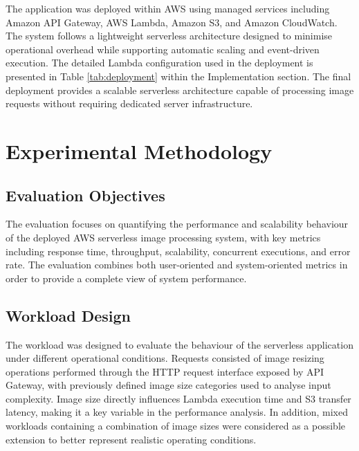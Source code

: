 \documentclass[11pt,a4paper,twocolumn]{article}
\begin{document}
The application was deployed within AWS using managed services including Amazon API Gateway, AWS Lambda, Amazon S3, and Amazon CloudWatch. The system follows a lightweight serverless architecture designed to minimise operational overhead while supporting automatic scaling and event-driven execution. The detailed Lambda configuration used in the deployment is presented in Table \ref{tab:deployment} within the Implementation section.
The final deployment provides a scalable serverless architecture capable of processing image requests without requiring dedicated server infrastructure.


\section{Experimental Methodology}

\subsection{Evaluation Objectives}

The evaluation focuses on quantifying the performance and scalability behaviour of the deployed AWS serverless image processing system, with key metrics including response time, throughput, scalability, concurrent executions, and error rate.
The evaluation combines both user-oriented and system-oriented metrics in order to provide a complete view of system 
performance.


\subsection{Workload Design}

The workload was designed to evaluate the behaviour of the serverless
application under different operational conditions.
Requests consisted of image resizing operations performed through the HTTP request interface exposed by API Gateway, with previously defined image size categories used to analyse input complexity. Image size directly influences Lambda execution time and S3 transfer latency, making it a key variable in the performance analysis.
In addition, mixed workloads containing a combination of image sizes
were considered as a possible extension to better represent realistic operating conditions.
\end{document}

